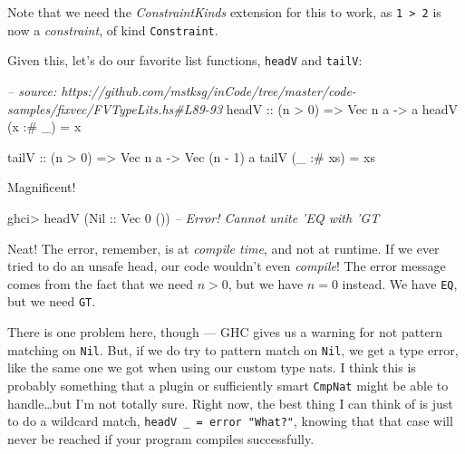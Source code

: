 \documentclass[]{article}
\newenvironment{Shaded}{}{}
\newcommand{\DataTypeTok}[1]{\textcolor[rgb]{0.56,0.13,0.00}{{#1}}}
\newcommand{\DecValTok}[1]{\textcolor[rgb]{0.25,0.63,0.44}{{#1}}}
\newcommand{\CommentTok}[1]{\textcolor[rgb]{0.38,0.63,0.69}{\textit{{#1}}}}
\newcommand{\OtherTok}[1]{\textcolor[rgb]{0.00,0.44,0.13}{{#1}}}
\newcommand{\FunctionTok}[1]{\textcolor[rgb]{0.02,0.16,0.49}{{#1}}}
\newcommand{\NormalTok}[1]{{#1}}
\begin{document}
Note that we need the \emph{ConstraintKinds} extension for this to work, as
\texttt{1\ \textgreater{}\ 2} is now a \emph{constraint}, of kind
\texttt{Constraint}.

Given this, let's do our favorite list functions, \texttt{headV} and
\texttt{tailV}:

\begin{Shaded}
\begin{Highlighting}[]
\CommentTok{-- source: https://github.com/mstksg/inCode/tree/master/code-samples/fixvec/FVTypeLits.hs#L89-93}
\OtherTok{headV ::} \NormalTok{(n }\FunctionTok{>} \DecValTok{0}\NormalTok{) }\OtherTok{=>} \DataTypeTok{Vec} \NormalTok{n a }\OtherTok{->} \NormalTok{a}
\NormalTok{headV (x }\FunctionTok{:#} \NormalTok{_)  }\FunctionTok{=} \NormalTok{x}

\OtherTok{tailV ::} \NormalTok{(n }\FunctionTok{>} \DecValTok{0}\NormalTok{) }\OtherTok{=>} \DataTypeTok{Vec} \NormalTok{n a }\OtherTok{->} \DataTypeTok{Vec} \NormalTok{(n }\FunctionTok{-} \DecValTok{1}\NormalTok{) a}
\NormalTok{tailV (_ }\FunctionTok{:#} \NormalTok{xs) }\FunctionTok{=} \NormalTok{xs}
\end{Highlighting}
\end{Shaded}

Magnificent!

\begin{Shaded}
\begin{Highlighting}[]
\NormalTok{ghci}\FunctionTok{>} \NormalTok{headV (}\DataTypeTok{Nil}\OtherTok{ ::} \DataTypeTok{Vec} \DecValTok{0} \NormalTok{())}
\CommentTok{-- Error!  Cannot unite 'EQ with 'GT}
\end{Highlighting}
\end{Shaded}

Neat! The error, remember, is at \emph{compile time}, and not at runtime. If we
ever tried to do an unsafe head, our code wouldn't even \emph{compile}! The
error message comes from the fact that we need \(n > 0\), but we have \(n = 0\)
instead. We have \texttt{EQ}, but we need \texttt{GT}.

There is one problem here, though --- GHC gives us a warning for not pattern
matching on \texttt{Nil}. But, if we do try to pattern match on \texttt{Nil}, we
get a type error, like the same one we got when using our custom type nats. I
think this is probably something that a plugin or sufficiently smart
\texttt{CmpNat} might be able to handle\ldots{}but I'm not totally sure. Right
now, the best thing I can think of is just to do a wildcard match,
\texttt{headV\ \_\ =\ error\ "What?"}, knowing that that case will never be
reached if your program compiles successfully.
\end{document}
